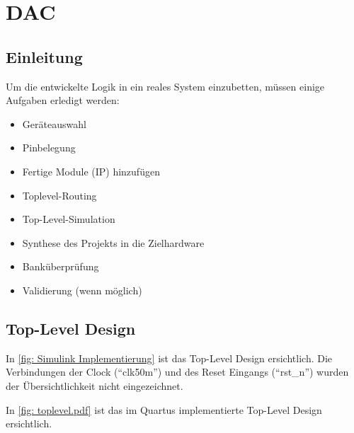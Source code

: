 \documentclass[./\jobname.tex]{subfiles}
\begin{document}
%
\def\codeFolderName{DSM_DAC_toplevel_design_starting_point}
\def\codeFileName{}
\def\codeFolderNameB{}
%
\chapter{DAC}
%
\section{Einleitung}
%
Um die entwickelte Logik in ein reales System einzubetten, müssen einige Aufgaben erledigt werden:
%
\begin{itemize}
	\item Geräteauswahl
	\item Pinbelegung
	\item Fertige Module (IP) hinzufügen
	\item Toplevel-Routing
	\item Top-Level-Simulation
	\item Synthese des Projekts in die Zielhardware
	\item Banküberprüfung
	\item Validierung (wenn möglich)
\end{itemize}
%
\section{Top-Level Design}
%
In \autoref{fig: Simulink Implementierung} ist das Top-Level Design ersichtlich. Die Verbindungen der Clock (\enquote{clk50m}) und des Reset Eingangs (\enquote{rst\_n}) wurden der Übersichtlichkeit nicht eingezeichnet.
%
\begin{figure}[H]
	\centering
	\noindent{}
	\label{fig: Simulink Implementierung}
\end{figure}
%
In \autoref{fig: toplevel.pdf} ist das im Quartus implementierte Top-Level Design ersichtlich.
%
\begin{figure}[H]
	\centering
	\noindent{}
	\label{fig: toplevel.pdf}
\end{figure}
%
\end{document}
